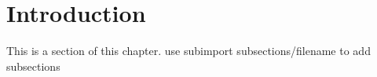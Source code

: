 
\section{Introduction}
This is a section of this chapter.
use subimport {subsections/}{filename} to add subsections 
